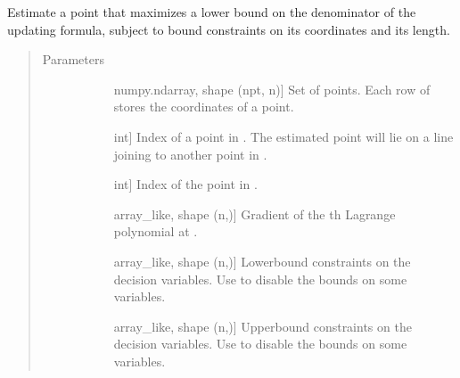 \documentclass[letterpaper,10pt,english]{sphinxmanual}
\begin{document}
\begin{fulllineitems}
\label{\detokenize{refs/generated/cobyqa.linalg.bvlag:cobyqa.linalg.bvlag}}
\sphinxAtStartPar
Estimate a point that maximizes a lower bound on the denominator of the
updating formula, subject to bound constraints on its coordinates and its
length.
\begin{quote}\begin{description}
\item[{Parameters}] \leavevmode\begin{description}
\item[{}] \leavevmode{[}numpy.ndarray, shape (npt, n){]}
\sphinxAtStartPar
Set of points. Each row of  stores the coordinates of a point.

\item[{}] \leavevmode{[}int{]}
\sphinxAtStartPar
Index of a point in . The estimated point will lie on a line
joining  to another point in .

\item[{}] \leavevmode{[}int{]}
\sphinxAtStartPar
Index of the point in .

\item[{}] \leavevmode{[}array\_like, shape (n,){]}
\sphinxAtStartPar
Gradient of the \sphinxhyphen{}th Lagrange polynomial at .

\item[{}] \leavevmode{[}array\_like, shape (n,){]}
\sphinxAtStartPar
Lower\sphinxhyphen{}bound constraints on the decision variables. Use  to
disable the bounds on some variables.

\item[{}] \leavevmode{[}array\_like, shape (n,){]}
\sphinxAtStartPar
Upper\sphinxhyphen{}bound constraints on the decision variables. Use  to
disable the bounds on some variables.


\end{description}
\end{description}
\end{quote}
\end{fulllineitems}
\end{document}
